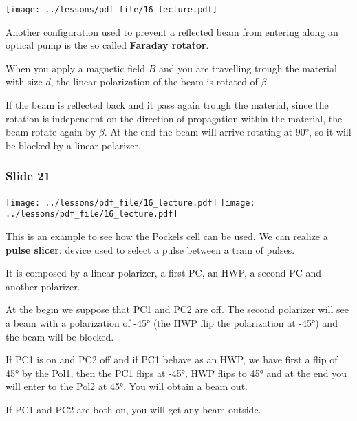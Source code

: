\documentclass[../main/main.tex]{subfiles}
\begin{document}
\begin{minipage}[]{0.5\linewidth}
\centering
\texttt{[image: ../lessons/pdf\_file/16\_lecture.pdf]}
\end{minipage}
\hspace{0.3cm}\vspace{0.3cm}
\begin{minipage}[c]{0.47\linewidth}

Another configuration used to prevent a reflected beam from entering along an optical pump is the so called \textbf{Faraday rotator}.

When you apply a magnetic field \( B \) and you are travelling trough the material with size \( d \), the linear polarization of the beam is rotated of \( \beta  \).

If the beam is reflected back and it pass again trough the material, since the rotation is independent on the direction of propagation within the material,
the beam rotate again by \( \beta  \).
At the end the beam will arrive rotating at 90°, so it will be blocked by a linear polarizer.

\end{minipage}

\subsubsection*{Slide 21}

\begin{minipage}[]{0.5\linewidth}
\centering
\texttt{[image: ../lessons/pdf\_file/16\_lecture.pdf]}
\texttt{[image: ../lessons/pdf\_file/16\_lecture.pdf]}
\end{minipage}
\hspace{0.3cm}\vspace{0.3cm}
\begin{minipage}[c]{0.47\linewidth}

This is an example to see how the Pockels cell can be used. We can realize a \textbf{pulse slicer}: device used to select a pulse between a train of pulses.

It is composed by a linear polarizer, a first PC, an HWP, a second PC and another polarizer.

At the begin we suppose that PC1 and PC2 are off. The second polarizer will see a beam with a polarization of -45° (the HWP flip the polarization at -45°) and the beam will be blocked.

If PC1 is on and PC2 off and if PC1 behave as an HWP, we have first a flip of 45° by the Pol1, then the PC1 flips at -45°, HWP flips to 45° and at the end you will enter to the Pol2 at 45°. You will obtain a beam out.

If PC1 and PC2 are both on, you will get any beam outside.


\end{minipage}
\end{document}
